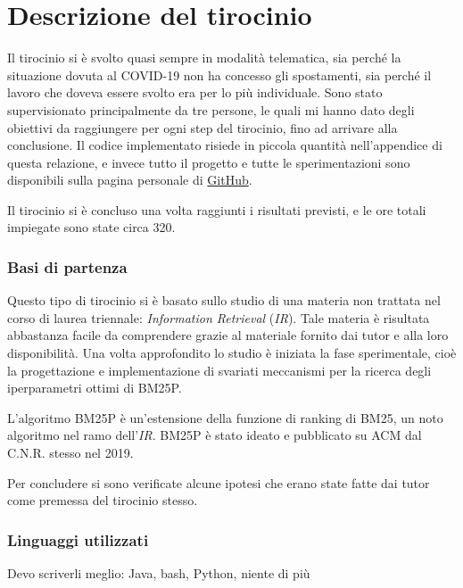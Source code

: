 \chapter{Descrizione del tirocinio}

Il tirocinio si è svolto quasi sempre in modalità telematica,
sia perché la situazione dovuta al COVID-19 non ha concesso
gli spostamenti, sia perché  il lavoro che doveva essere svolto
era per lo più individuale.
Sono stato supervisionato principalmente da tre persone,
le quali mi hanno dato degli obiettivi da raggiungere per ogni
step del tirocinio,
fino ad arrivare alla conclusione.
Il codice implementato risiede in piccola
quantità nell'appendice di questa relazione,
e invece tutto il progetto e tutte le sperimentazioni
sono disponibili sulla pagina personale di \href{https://github.com/federicosilvestri/bm25p-thesis}{GitHub}.

Il tirocinio si è concluso una volta raggiunti i risultati
previsti, e le ore totali impiegate sono state circa 320.

\subsection{Basi di partenza}
Questo tipo di tirocinio si è basato
sullo studio di una materia non trattata nel corso di laurea triennale:
\textit{Information Retrieval} (\textit{IR}).
Tale materia è risultata abbastanza facile da comprendere grazie
al materiale fornito dai tutor e alla loro disponibilità.
Una volta approfondito lo studio è iniziata la fase sperimentale,
cioè la progettazione e implementazione di svariati meccanismi per la ricerca 
degli iperparametri ottimi di BM25P.

L'algoritmo BM25P è un'estensione della funzione di ranking
di BM25, un noto algoritmo nel ramo dell'\textit{IR}.
BM25P è stato ideato e pubblicato su ACM dal C.N.R.
stesso nel 2019.\cite{10.1145/3331184.3331373}

Per concludere si sono verificate alcune ipotesi
che erano state fatte dai tutor come premessa
del tirocinio stesso.

\subsection{Linguaggi utilizzati}
Devo scriverli meglio: Java, bash, Python, niente di più
